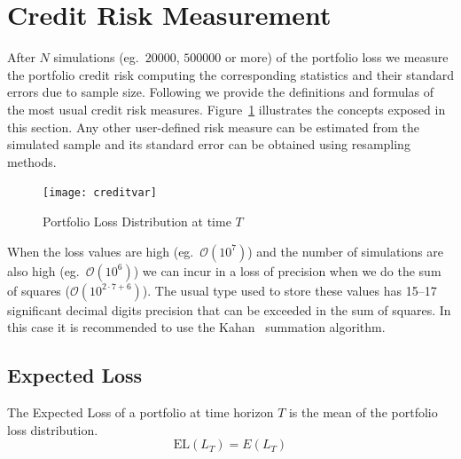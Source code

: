 \documentclass[11pt,fleqn]{book} %
\begin{document}
\section{Credit Risk Measurement}
\label{sec:riskm}

After $N$ simulations (eg.\ $20000$, $500000$ or more) of the portfolio loss
we measure the portfolio credit risk computing the corresponding statistics 
and their standard errors due to sample size. Following we provide the 
definitions and formulas of the most usual credit risk measures. 
Figure~\ref{fig:lossdistr} illustrates the concepts exposed in this section.
Any other user-defined risk measure can be estimated from the simulated 
sample and its standard error can be obtained using resampling methods.
\begin{figure}[!ht]
	\centering
	\texttt{[image: creditvar]}
	\caption{Portfolio Loss Distribution at time $T$}
	\label{fig:lossdistr}
\end{figure}

When the loss values are high (eg.\ $\mathcal{O}(10^7)$) and the number of 
simulations are also high (eg.\ $\mathcal{O}(10^6)$) we can incur in a loss of 
precision when we do the sum of squares ($\mathcal{O}(10^{2 \cdot 7 + 6})$). 
The usual type used to store these values has 15--17 significant decimal 
digits precision that can be exceeded in the sum of squares. In this case it 
is recommended to use the Kahan~\cite{kahan:1965} summation algorithm.

\subsection{Expected Loss}

\begin{definition}
	The Expected Loss of a portfolio at time horizon $T$ is the 
	mean of the portfolio loss distribution.
	\begin{displaymath}
		\text{EL}(L_T) = E(L_T)
	\end{displaymath}
\end{definition}
\end{document}
